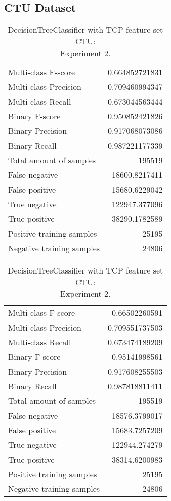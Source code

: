 \subsection{CTU Dataset}

\begin{table}[H]
\begin{minipage}{0.5\textwidth}
\caption{DecisionTreeClassifier with TCP feature set CTU: \\Experiment 1.}
\centering
\begin{tabular}{l r}
\toprule
Multi-class F-score & 0.664852721831 \\
Multi-class Precision & 0.709460994347 \\
Multi-class Recall & 0.673044563444 \\
\midrule
Binary F-score & 0.950852421826 \\
Binary Precision & 0.917068073086 \\
Binary Recall & 0.987221177339 \\
\midrule
Total amount of samples & 195519 \\
False negative & 18600.8217411 \\
False positive & 15680.6229042 \\
True negative & 122947.377096 \\
True positive & 38290.1782589 \\
\midrule
Positive training samples & 25195 \\
Negative training samples & 24806 \\
\bottomrule
\end{tabular}
\end{minipage}
\hfillx
\begin{minipage}{0.5\textwidth}
\caption{DecisionTreeClassifier with TCP feature set CTU: \\Experiment 2.}
\centering
\begin{tabular}{l r}
\toprule
Multi-class F-score & 0.66502260591 \\
Multi-class Precision & 0.709551737503 \\
Multi-class Recall & 0.673474189209 \\
\midrule
Binary F-score & 0.95141998561 \\
Binary Precision & 0.917608255503 \\
Binary Recall & 0.987818811411 \\
\midrule
Total amount of samples & 195519 \\
False negative & 18576.3799017 \\
False positive & 15683.7257209 \\
True negative & 122944.274279 \\
True positive & 38314.6200983 \\
\midrule
Positive training samples & 25195 \\
Negative training samples & 24806 \\
\bottomrule
\end{tabular}
\end{minipage}
\end{table}
